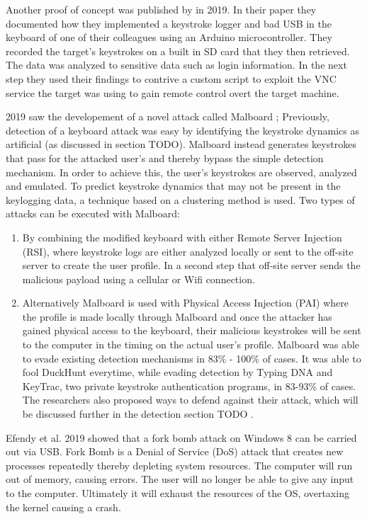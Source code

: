 Another proof of concept was published by \cite{bojovicRisingThreatHardware2019} in 2019. In their paper they documented how they implemented a keystroke logger and bad USB in the keyboard of one of their colleagues using an Arduino microcontroller. They recorded the target's keystrokes on a built in SD card that they then retrieved. The data was analyzed to sensitive data such as login information. In the next step they used their findings to contrive a custom script to exploit the VNC service the target was using to gain remote control overt the target machine. 

\label{malboard}2019 saw the developement of a novel attack called Malboard \cite{farhiMalboardNovelUser2019}; Previously, detection of a keyboard attack was easy by identifying the keystroke dynamics as artificial (as discussed in section TODO). Malboard instead generates keystrokes that pass for the attacked user's and thereby bypass the simple detection mechanism. In order to achieve this, the user's keystrokes are observed, analyzed and emulated. To predict keystroke dynamics that may not be present in the keylogging data, a technique based on a clustering method is used. Two types of attacks can be executed with Malboard: 
\begin{enumerate}
    \item By combining the modified keyboard with either Remote Server Injection (RSI), where keystroke logs are either analyzed locally or sent to the off-site server to create the user profile. In a second step that off-site server sends the malicious payload using a cellular or Wifi connection. 
    \item Alternatively Malboard is used with Physical Access Injection (PAI) where the profile is made locally through Malboard and once the attacker has gained physical access to the keyboard, their malicious keystrokes will be sent to the computer in the timing on the actual user's profile. 
 Malboard was able to evade existing detection mechanisms in 83\% - 100\% of cases. It was able to fool DuckHunt everytime, while evading detection by Typing DNA and KeyTrac, two private keystroke authentication programs, in 83-93\% of cases. The researchers also proposed ways to defend against their attack, which will be discussed further in the detection section TODO .
\end{enumerate}

Efendy et al. 2019 \cite{efendyExploringPossibilityUSB2019} showed that a fork bomb attack on Windows 8 can be carried out via USB. Fork Bomb is a Denial of Service (DoS) attack that creates new processes repeatedly thereby depleting system resources. The computer will run out of memory, causing errors. The user will no longer be able to give any input to the computer. Ultimately it will exhaust the resources of the OS, overtaxing the kernel causing a crash.  


